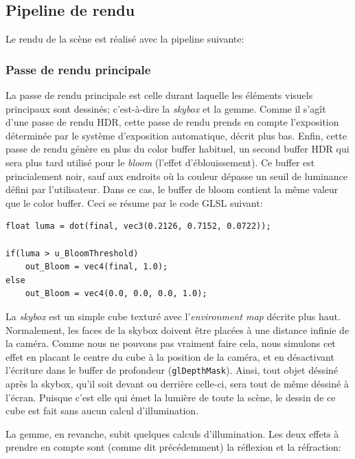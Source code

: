 \documentclass[a4paper,12pt]{article}
\newcommand{\svg}[2][0cm]{
    \begin{figure}[H]
        \centering
        \def\svgwidth{\columnwidth - #1}
        
    \end{figure}
}
\begin{document}
\subsection{Pipeline de rendu}
Le rendu de la scène est réalisé avec la pipeline suivante:
\svg{PipelineDeRendu}

\subsubsection{Passe de rendu principale}
La passe de rendu principale est celle durant laquelle les éléments visuels principaux sont dessinés; c'est-à-dire
la \emph{skybox} et la gemme. Comme il s'agît d'une passe de rendu HDR, cette passe de rendu prends en compte
l'exposition déterminée par le système d'exposition automatique, décrit plus bas. Enfin, cette passe de rendu
génère en plus du color buffer habituel, un second buffer HDR qui sera plus tard utilisé pour le \emph{bloom}
(l'effet d'éblouissement). Ce buffer est princialement noir, sauf aux endroits où la couleur dépasse un
seuil de luminance défini par l'utilisateur. Dans ce cas, le buffer de bloom contient la même valeur que le color
buffer. Ceci se résume par le code GLSL suivant:

\begin{lstlisting}
float luma = dot(final, vec3(0.2126, 0.7152, 0.0722));

if(luma > u_BloomThreshold)
    out_Bloom = vec4(final, 1.0);
else
    out_Bloom = vec4(0.0, 0.0, 0.0, 1.0);
\end{lstlisting}

La \emph{skybox} est un simple cube texturé avec l'\emph{environment map} décrite plus haut. Normalement, les faces
de la skybox doivent être placées à une distance infinie de la caméra. Comme nous ne pouvons pas vraiment faire cela,
nous simulons cet effet en placant le centre du cube à la position de la caméra, et en désactivant l'écriture dans le buffer
de profondeur (\texttt{glDepthMask}). Ainsi, tout objet déssiné après la skybox, qu'il soit devant ou derrière
celle-ci, sera tout de même déssiné à l'écran. Puisque c'est elle qui émet la lumière de toute la scène, le dessin de
ce cube est fait sans aucun calcul d'illumination.

La gemme, en revanche, subit quelques calculs d'illumination. Les deux effets à prendre en compte sont (comme dit précédemment)
la réflexion et la réfraction:
\svg[8cm]{refraction}
\end{document}
